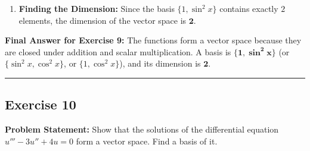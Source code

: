 \documentclass[11pt,a4paper]{article}
\begin{document}
\begin{enumerate}
    Now we verify that $\{1, \sin^2 x\}$ is linearly independent. Suppose:
    \[
        k_1 \cdot 1 + k_2 \sin^2 x = 0 \quad \text{for all } x \in \mathbb{R}.
    \]
    \begin{itemize}
        \item Evaluating at $x = 0$: $k_1 + k_2 \sin^2(0) = 0 \implies k_1 = 0$.
        \item Evaluating at $x = \frac{\pi}{2}$: $k_1 + k_2 \sin^2\left(\frac{\pi}{2}\right) = 0 \implies 0 + k_2(1)^2 = 0 \implies k_2 = 0$.
    \end{itemize}
    Since $k_1 = k_2 = 0$, the functions $1$ and $\sin^2 x$ are linearly independent and span $V$. Thus, $\{1, \sin^2 x\}$ is a basis of $V$ (note that $\{1, \cos^2 x\}$ or $\{\sin^2 x, \cos^2 x\}$ or $\{1, \cos 2x\}$ are also valid bases).

    \item \textbf{Finding the Dimension:}
    Since the basis $\{1, \sin^2 x\}$ contains exactly $2$ elements, the dimension of the vector space is $\mathbf{2}$.
\end{enumerate}

\textbf{Final Answer for Exercise 9:} The functions form a vector space because they are closed under addition and scalar multiplication. A basis is $\mathbf{\{1, \sin^2 x\}}$ (or $\{\sin^2 x, \cos^2 x\}$, or $\{1, \cos^2 x\}$), and its dimension is $\mathbf{2}$.

\bigskip
\hrule
\bigskip

\subsection*{Exercise 10}
\textbf{Problem Statement:} Show that the solutions of the differential equation $u''' - 3u'' + 4u = 0$ form a vector space. Find a basis of it.
\end{document}

